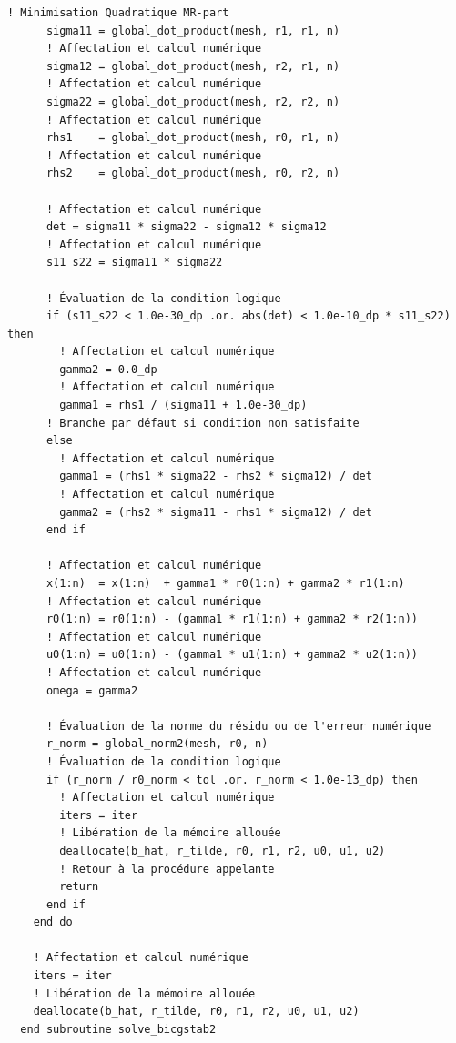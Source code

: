 \documentclass[10pt,a4paper,oneside]{book}
\begin{document}
\begin{lstlisting}[language={[95]Fortran}]
      ! Minimisation Quadratique MR-part
      sigma11 = global_dot_product(mesh, r1, r1, n)
      ! Affectation et calcul numérique
      sigma12 = global_dot_product(mesh, r2, r1, n)
      ! Affectation et calcul numérique
      sigma22 = global_dot_product(mesh, r2, r2, n)
      ! Affectation et calcul numérique
      rhs1    = global_dot_product(mesh, r0, r1, n)
      ! Affectation et calcul numérique
      rhs2    = global_dot_product(mesh, r0, r2, n)

      ! Affectation et calcul numérique
      det = sigma11 * sigma22 - sigma12 * sigma12
      ! Affectation et calcul numérique
      s11_s22 = sigma11 * sigma22

      ! Évaluation de la condition logique
      if (s11_s22 < 1.0e-30_dp .or. abs(det) < 1.0e-10_dp * s11_s22) then
        ! Affectation et calcul numérique
        gamma2 = 0.0_dp
        ! Affectation et calcul numérique
        gamma1 = rhs1 / (sigma11 + 1.0e-30_dp)
      ! Branche par défaut si condition non satisfaite
      else
        ! Affectation et calcul numérique
        gamma1 = (rhs1 * sigma22 - rhs2 * sigma12) / det
        ! Affectation et calcul numérique
        gamma2 = (rhs2 * sigma11 - rhs1 * sigma12) / det
      end if

      ! Affectation et calcul numérique
      x(1:n)  = x(1:n)  + gamma1 * r0(1:n) + gamma2 * r1(1:n)
      ! Affectation et calcul numérique
      r0(1:n) = r0(1:n) - (gamma1 * r1(1:n) + gamma2 * r2(1:n))
      ! Affectation et calcul numérique
      u0(1:n) = u0(1:n) - (gamma1 * u1(1:n) + gamma2 * u2(1:n))
      ! Affectation et calcul numérique
      omega = gamma2

      ! Évaluation de la norme du résidu ou de l'erreur numérique
      r_norm = global_norm2(mesh, r0, n)
      ! Évaluation de la condition logique
      if (r_norm / r0_norm < tol .or. r_norm < 1.0e-13_dp) then
        ! Affectation et calcul numérique
        iters = iter
        ! Libération de la mémoire allouée
        deallocate(b_hat, r_tilde, r0, r1, r2, u0, u1, u2)
        ! Retour à la procédure appelante
        return
      end if
    end do

    ! Affectation et calcul numérique
    iters = iter
    ! Libération de la mémoire allouée
    deallocate(b_hat, r_tilde, r0, r1, r2, u0, u1, u2)
  end subroutine solve_bicgstab2


\end{lstlisting}
\end{document}
